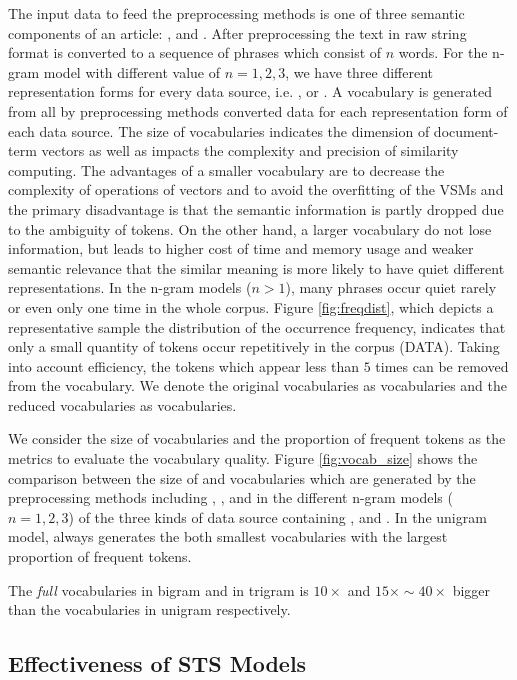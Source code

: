 The input data to feed the preprocessing methods is one of three semantic components of an article: \ititle{}, \isummary{} and \icontent{}. After preprocessing the text in raw string format is converted to a sequence of phrases which consist of $n$ words. For the n-gram model with different value of $n = 1, 2, 3$, we have three different representation forms for every data source, i.e. \ititle{}, \isummary{} or \icontent{}. A vocabulary is generated from all by preprocessing methods converted data for each representation form of each data source. The size of vocabularies indicates the dimension of document-term vectors as well as impacts the complexity and precision of similarity computing. The advantages of a smaller vocabulary are to decrease the complexity of operations of vectors and to avoid the overfitting of the VSMs and the primary disadvantage is that the semantic information is partly dropped due to the ambiguity of tokens. On the other hand, a larger vocabulary do not lose information, but leads to higher cost of time and memory usage and weaker semantic relevance that the similar meaning is more likely to have quiet different representations. In the n-gram models ($n > 1$), many phrases occur quiet rarely or even only one time in the whole corpus. Figure \ref{fig:freqdist}, which depicts a representative sample the distribution of the occurrence frequency, indicates that only a small quantity of tokens occur repetitively in the corpus (DATA). Taking into account efficiency, the tokens which appear less than $5$ times can be removed from the vocabulary. We denote the original vocabularies as \ifull{} vocabularies and the reduced vocabularies as \icommon{} vocabularies. 

We consider the size of \ifull{} vocabularies and the proportion of frequent tokens as the metrics to evaluate the vocabulary quality. Figure \ref{fig:vocab_size} shows the comparison between the size of \ifull{} and \icommon{} vocabularies which are generated by the preprocessing methods including \iSP{}, \iSE{}, \iST{} and \iSS{} in the different n-gram models ($n=1, 2, 3$) of the three kinds of data source containing \icontent{}, \ititle{} and \isummary{}. In the unigram model, \iSS{} always generates the both smallest vocabularies with the largest proportion of frequent tokens. 

The \textit{full} vocabularies in bigram and in trigram is $10\times$ and $15\times \sim 40\times$ bigger than the vocabularies in unigram respectively. 

\subsection{Effectiveness of STS Models}
\label{sec:5.2}

